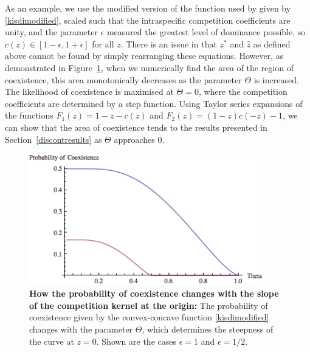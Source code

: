 As an example, we use the modified version of the function used by \cite{kisdi1999evolutionary} given by \eqref{kisdimodified}, scaled such that the intraspecific competition coefficients are unity, and the parameter $\epsilon$ measured the greatest level of dominance possible, so $c(z) \in [1-\epsilon,1+\epsilon]$ for all $z$.  There is an issue in that $z^*$ and $\hat{z}$ as defined above cannot be found by simply rearranging these equations. However, as demonstrated in Figure~\ref{kisdipic}, when we numerically find the area of the region of coexistence, this area monotonically decreases as the parameter $\Theta$ is increased. The likelihood of coexistence is maximised at $\Theta=0$, where the competition coefficients are determined by a step function. Using Taylor series expansions of the functions $F_1(z)=1-z-c(z)$ and $F_2(z)=(1-z)c(-z)-1$, we can show that the area of coexistence tends to the results presented in Section~\ref{discontresults} as $\Theta$ approaches 0.

\begin{figure}[htbp]
   \centering
   \includegraphics[width=4in]{kisdinum}
   \caption[How the probability of coexistence changes with the slope of the competition kernel at the origin]{\textbf{How the probability of coexistence changes with the slope of the competition kernel at the origin:} The probability of coexistence given by the convex-concave function \eqref{kisdimodified} changes with the parameter $\Theta$, which determines the steepness of the curve at $z=0$. Shown are the cases $\epsilon=1$ and $\epsilon=1/2$.}
   \label{kisdipic}
\end{figure}
 
